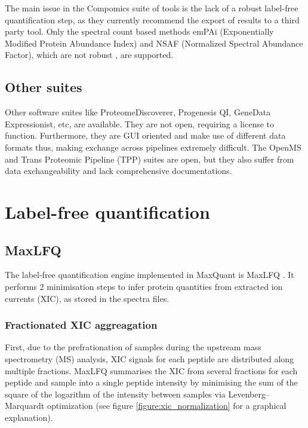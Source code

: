 \documentclass[11pt, a4paper]{report}
\begin{document}
The main issue in the Compomics suite of tools is the lack of a robust label-free quantification step, as they currently recommend the export of results to a third party tool. Only the spectral count based methods emPAi (Exponentially Modified Protein Abundance Index) and NSAF (Normalized Spectral Abundance Factor), which are not robust \cite{Griffin2010}, are supported.


\subsection{Other suites}

Other software suites like ProteomeDiscoverer, Progenesis QI, GeneData Expressionist, etc, are available. They are not open, requiring a license to function. Furthermore, they are GUI oriented and make use of different data formats thus, making exchange across pipelines extremely difficult. The OpenMS \cite{Sturm2008} and Trans Proteomic Pipeline (TPP) \cite{Deutsch2011} suites are open, but they also suffer from data exchangeability and lack comprehensive documentations.

\section{Label-free quantification}

\subsection{MaxLFQ}

The label-free quantification engine implemented in MaxQuant is MaxLFQ \cite{Cox2014}. It performs 2 minimisation steps to infer protein quantities from extracted ion currents (XIC), as stored in the spectra files.

\subsubsection{Fractionated XIC aggreagation}

First, due to the prefrationation of samples during the upstream mass spectrometry (MS) analysis, XIC signals for each peptide are distributed along multiple fractions. MaxLFQ summarises the XIC from several fractions for each peptide and sample into a single peptide intensity by minimising the sum of the square of the logarithm of the intensity 
 between samples via Levenberg–Marquardt optimization (see figure \ref{figure:xic_normalization} for a graphical explanation). 
\end{document}
